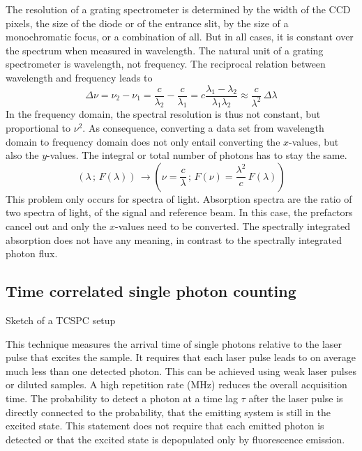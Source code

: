 The resolution of a grating spectrometer is determined by the width of the CCD pixels, the size of the diode or of the entrance slit, by the size of a monochromatic focus, or a combination of all. But in all cases, it is constant over the spectrum when measured in wavelength. The natural unit of a grating spectrometer is wavelength, not frequency. The reciprocal relation between wavelength and frequency leads to 
\begin{equation}
 \Delta \nu = \nu_2 - \nu_1 = \frac{c}{\lambda_2} - \frac{c}{\lambda_1}  = c \frac{\lambda_1 - \lambda_2}{\lambda_1 \lambda_2} \approx \frac{c}{\lambda^2} \, \Delta \lambda
\end{equation}
In the frequency domain, the spectral resolution is thus not constant, but proportional to $\nu^2$. As consequence, converting a data set from wavelength domain to frequency domain does not only entail converting the $x$-values, but also the $y$-values. The integral or total number of photons has to stay the same.
\begin{equation}
 \left( \lambda \, ; \, F(\lambda) \right) \, \rightarrow  \left( \nu = \frac{c}{ \lambda} \, ; \,  F(\nu) = \frac{\lambda^2}{ c } \, F(\lambda) \right) 
\end{equation}
This problem only occurs for spectra of light. Absorption spectra are the ratio of two spectra of light, of the signal and reference beam. In this case, the prefactors cancel out and only the $x$-values need to be converted. The spectrally integrated absorption does not have any meaning, in contrast to the spectrally integrated photon flux.



\subsection{Time correlated single photon counting}

\begin{marginfigure}
  \caption{Sketch of a TCSPC setup}
\end{marginfigure}

This technique measures the arrival time of single photons relative to the laser pulse that excites the sample. It requires that each laser pulse leads to on average much less than one detected photon. This can be achieved using weak laser pulses or diluted samples. A high repetition rate (MHz) reduces the overall acquisition time. The probability to detect a photon at a time lag $\tau$ after the laser pulse is directly connected to the probability, that the emitting system is still in the excited state. This statement does not require that each emitted photon is detected or that the excited state is depopulated only by fluorescence emission.





